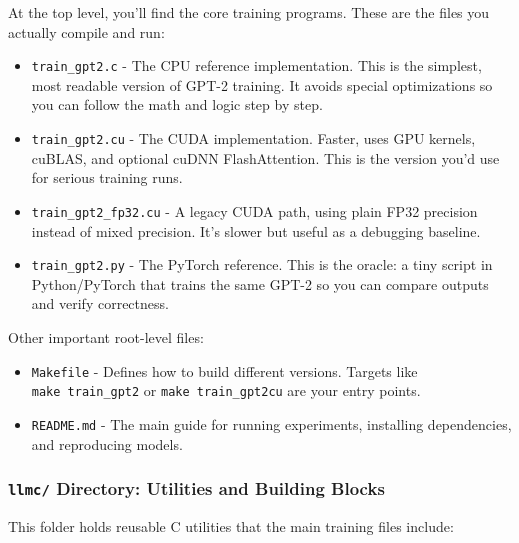 \documentclass[
  letterpaper,
  DIV=11,
  numbers=noendperiod]{scrreprt}
\providecommand{\tightlist}{%
  \setlength{\itemsep}{0pt}\setlength{\parskip}{0pt}}
\begin{document}
At the top level, you'll find the core training programs. These are the
files you actually compile and run:

\begin{itemize}
\tightlist
\item
  \texttt{train\_gpt2.c} - The CPU reference implementation. This is the
  simplest, most readable version of GPT-2 training. It avoids special
  optimizations so you can follow the math and logic step by step.
\item
  \texttt{train\_gpt2.cu} - The CUDA implementation. Faster, uses GPU
  kernels, cuBLAS, and optional cuDNN FlashAttention. This is the
  version you'd use for serious training runs.
\item
  \texttt{train\_gpt2\_fp32.cu} - A legacy CUDA path, using plain FP32
  precision instead of mixed precision. It's slower but useful as a
  debugging baseline.
\item
  \texttt{train\_gpt2.py} - The PyTorch reference. This is the oracle: a
  tiny script in Python/PyTorch that trains the same GPT-2 so you can
  compare outputs and verify correctness.
\end{itemize}

Other important root-level files:

\begin{itemize}
\tightlist
\item
  \texttt{Makefile} - Defines how to build different versions. Targets
  like \texttt{make\ train\_gpt2} or \texttt{make\ train\_gpt2cu} are
  your entry points.
\item
  \texttt{README.md} - The main guide for running experiments,
  installing dependencies, and reproducing models.
\end{itemize}

\subsubsection{\texorpdfstring{\texttt{llmc/} Directory: Utilities and
Building
Blocks}{llmc/ Directory: Utilities and Building Blocks}}\label{llmc-directory-utilities-and-building-blocks}

This folder holds reusable C utilities that the main training files
include:
\end{document}
